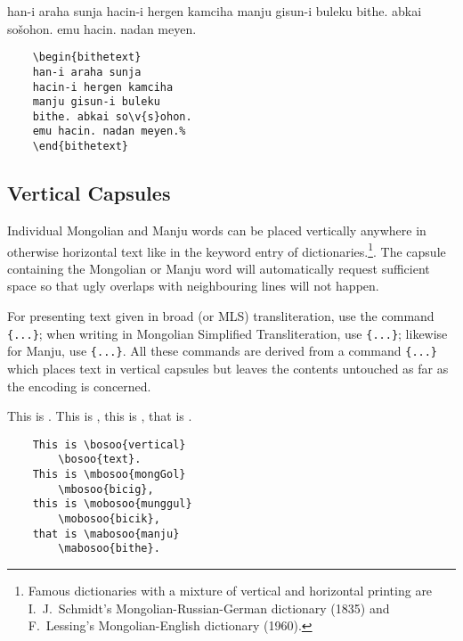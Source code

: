 \documentclass[11pt,a4paper]{article}
\begin{document}
\exa
	\begin{bithetext}
	han-i araha sunja
	hacin-i hergen kamciha
	manju gisun-i buleku
	bithe. abkai so\v{s}ohon.
	emu hacin. nadan meyen.%
	\end{bithetext}
\exb
	\begin{verbatim}
	\begin{bithetext}
	han-i araha sunja
	hacin-i hergen kamciha
	manju gisun-i buleku
	bithe. abkai so\v{s}ohon.
	emu hacin. nadan meyen.%
	\end{bithetext}
	\end{verbatim}
\exc

\subsection{Vertical Capsules}

Individual Mongolian and Manju words can be placed vertically
anywhere in otherwise horizontal text like in
the keyword entry of dictionaries.\footnote{Famous dictionaries with
	a mixture of vertical and horizontal printing are I.~J.~Schmidt's
	Mongolian-Russian-German dictionary (1835) and F.~Lessing's
	Mongolian-English dictionary (1960).}.
The capsule containing the
Mongolian or Manju word will automatically request sufficient space
so that ugly overlaps with neighbouring lines will not happen.

For presenting text given in broad (or MLS) transliteration, use the command
\verb|{...}|; when writing in Mongolian Simplified
Transliteration, use \verb|{...}|; likewise for Manju, use
\verb|{...}|. All these commands are derived from a
command \verb|{...}| which places text in vertical
capsules but leaves the contents untouched as far as the encoding is
concerned.

\exa
	This is 
		. 
	This is 
		, 
	this is 
		, 
	that is 
		.
\exb
	\begin{verbatim}
	This is \bosoo{vertical}
		\bosoo{text}. 
	This is \mbosoo{mongGol}
		\mbosoo{bicig}, 
	this is \mobosoo{munggul}
		\mobosoo{bicik}, 
	that is \mabosoo{manju}
		\mabosoo{bithe}.
	\end{verbatim}
\exc
\end{document}
